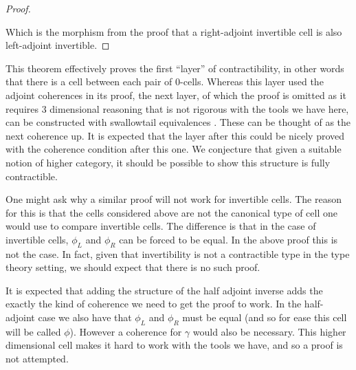 \documentclass{article}
\theoremstyle{definition}
\theoremstyle{remark}
\newcommand{\rinv}[1]{#1^\star}
\begin{document}
\begin{proof}
\begin{center}
  \end{center}

  Which is the morphism from the proof that a right-adjoint invertible cell is also left-adjoint invertible.
\end{proof}

This theorem effectively proves the first ``layer'' of contractibility, in other words that there is a cell between each pair of \(0\)-cells. Whereas this layer used the adjoint coherences in its proof, the next layer, of which the proof is omitted as it requires 3 dimensional reasoning that is not rigorous with the tools we have here, can be constructed with swallowtail equivalences . These can be thought of as the next coherence up. It is expected that the layer after this could be nicely proved with the coherence condition after this one. We conjecture that given a suitable notion of higher category, it should be possible to show this structure is fully contractible.

One might ask why a similar proof will not work for invertible cells. The reason for this is that the cells considered above are not the canonical type of cell one would use to compare invertible cells. The difference is that in the case of invertible cells, \(\phi_L\) and \(\phi_R\) can be forced to be equal. In the above proof this is not the case. In fact, given that invertibility is not a contractible type in the type theory setting, we should expect that there is no such proof.

It is expected that adding the structure of the half adjoint inverse adds the exactly the kind of coherence we need to get the proof to work. In the half-adjoint case we also have that \(\phi_L\) and \(\phi_R\) must be equal (and so for ease this cell will be called \(\phi\)). However a coherence for \(\gamma\) would also be necessary. This higher dimensional cell makes it hard to work with the tools we have, and so a proof is not attempted.
\end{document}
